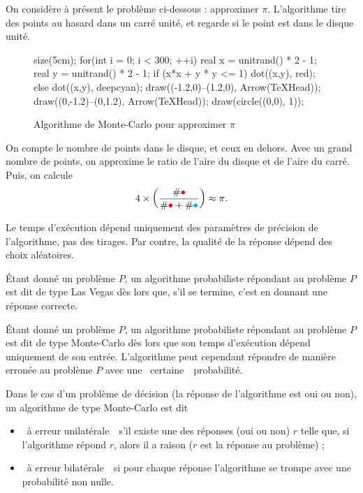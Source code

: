 \begin{exm}
	On considère à présent le problème ci-dessous : approximer $\pi$.
	L'algorithme tire des points au hasard dans un carré unité, et regarde si le point est dans le disque unité.

	\begin{figure}[H]
		\centering
		\begin{asy}
			size(5cm);
			for(int i = 0; i < 300; ++i) {
				real x = unitrand() * 2 - 1;
				real y = unitrand() * 2 - 1;
				if (x*x + y * y <= 1)
					dot((x,y), red);
				else
					dot((x,y), deepcyan);
			}
			draw((-1.2,0)--(1.2,0), Arrow(TeXHead));
			draw((0,-1.2)--(0,1.2), Arrow(TeXHead));
			draw(circle((0,0), 1));
		\end{asy}
		\caption{Algorithme de {\sc Monte-Carlo}\/ pour approximer $\pi$}
	\end{figure}

	On compte le nombre de points dans le disque, et ceux en dehors. Avec un grand nombre de points, on approxime le ratio de l'aire du disque et de l'aire du carré. Puis, on calcule \[
		4 \times \left( \frac{\#{\color{red}\bullet}}{\#{\color{red}\bullet} + \#{\color{cyan}\bullet}} \right) \approx \pi
	.\]

	Le temps d'exécution dépend uniquement des paramètres de précision de l'algorithme, pas des tirages.
	Par contre, la qualité de la réponse dépend des choix aléatoires.
\end{exm}

\begin{defn}
	Étant donné un problème $P$, un algorithme probabiliste répondant au problème $P$\/ est dit de type {\sc Las Vegas}\/ dès lors que, s'il se termine, c'est en donnant une réponse correcte.
\end{defn}

\begin{defn}
	Étant donné un problème $P$, un algorithme probabiliste répondant au problème $P$\/ est dit de type {\sc Monte-Carlo}\/ dès lors que son temps d'exécution dépend uniquement de son entrée.
	L'algorithme peut cependant répondre de manière erronée au problème $P$\/ avec une \guillemotleft~certaine~\guillemotright\ probabilité.
\end{defn}

\begin{rmk}
	Dans le cas d'un problème de décision (la réponse de l'algorithme est {\sc oui}\/ ou {\sc non}), un algorithme de type {\sc Monte-Carlo}\/ est dit
	\begin{itemize}
		\item \guillemotleft~à erreur unilatérale~\guillemotright\ s'il existe une des réponses ({\sc oui}\/ ou {\sc non}) $r$\/ telle que, si l'algorithme répond $r$, alors il a raison ($r$\/ est la réponse au problème) ;
		\item \guillemotleft~à erreur bilatérale~\guillemotright\  si pour chaque réponse l'algorithme se trompe avec une probabilité non nulle.
	\end{itemize}
\end{rmk}

